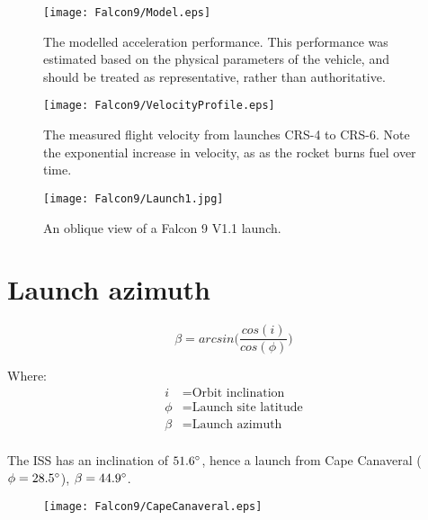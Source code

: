 \begin{figure}[!htb] 
    \centering
    \texttt{[image: Falcon9/Model.eps]}
    \caption{The modelled acceleration performance. This performance was estimated based on the physical parameters of the vehicle, and should be treated as representative, rather than authoritative.}
    \label{fig:Falcon9Model}
\end{figure}


\begin{figure}[!htb] 
    \centering
    \texttt{[image: Falcon9/VelocityProfile.eps]}
    \caption{The measured flight velocity from launches CRS-4 to CRS-6. Note the exponential increase in velocity, as as the rocket burns fuel over time.}
    \label{fig:Falcon9VelocityProfile}
\end{figure}



\begin{figure}[!htb] 
    \centering
    \texttt{[image: Falcon9/Launch1.jpg]}
    \caption{An oblique view of a Falcon 9 V1.1 launch. \cite{SpaceXFalcon9}}
    \label{fig:Falcon9Launch}
\end{figure}

\clearpage
\section{Launch azimuth}

\begin{equation}
\beta = arcsin \Big(\frac{cos(i)}{cos(\phi)}\Big)
\end{equation}

Where:
\begin{align*}
 i &= \text{Orbit inclination}\\
 \phi &= \text{Launch site latitude}\\
 \beta &= \text{Launch azimuth}\\
\end{align*}


The \ac{ISS} has an inclination of $51.6\degree$, hence a launch from Cape Canaveral ($\phi = 28.5\degree$), $\beta=44.9\degree$\cite{LaunchDesign}.


\begin{figure}[!htb] 
    \centering
    \texttt{[image: Falcon9/CapeCanaveral.eps]}
    \caption{}
    \label{fig:LaunchPath}
\end{figure}


\begin{comment}
\begin{figure}[!htb] 
    \centering
    \texttt{[image: Falcon9/Skyplot.pdf]}
    \caption{}
    \label{fig:Skyplot}
\end{figure}
\end{comment}

